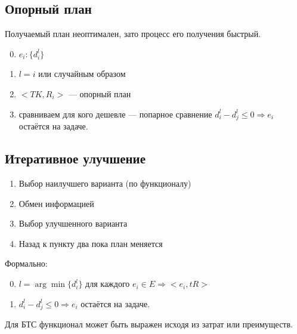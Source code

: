 \documentclass[12pt]{article}
\begin{document}
\subsection{Опорный план}
Получаемый план неоптимален, зато процесс его получения быстрый.

\begin{enumerate}
    \setcounter{enumi}{-1}
    \item $e_i : \{d_i^l\}$
    \item $l = i$ или случайным образом
    \item $<TK, R_i>$ — опорный план
    \item сравниваем для кого дешевле — попарное сравнение $d_i^l - d_j^l \leq 0 \Rightarrow e_i$ остаётся на задаче.
\end{enumerate}

\subsection{Итеративное улучшение}
\begin{enumerate}
    \item Выбор наилучшего варианта (по функционалу)
    \item Обмен информацией
    \item Выбор улучшенного варианта
    \item Назад к пункту два пока план меняется
\end{enumerate}

Формально:
\begin{enumerate}
    \setcounter{enumi}{-1}
    \item $l = \arg \min \{d_i^l\}$ для каждого $e_i \in E \Rightarrow <e_i, tR>$
    \item $d_i^l - d_j^l \leq 0 \Rightarrow e_i$ остаётся на задаче.
\end{enumerate}

Для БТС функционал может быть выражен исходя из затрат или преимуществ.
\end{document}
